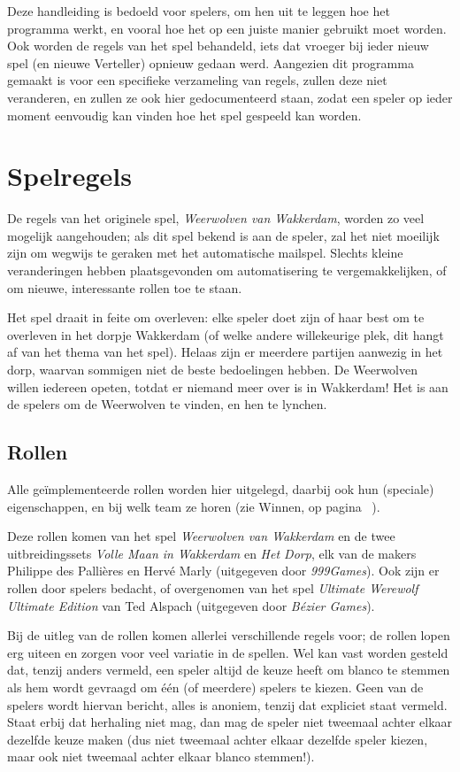 \documentclass[12pt]{article}
\begin{document}
    Deze handleiding is bedoeld voor spelers, om hen uit te leggen hoe het programma werkt, en vooral hoe het op een juiste manier gebruikt moet worden. Ook worden de regels van het spel behandeld, iets dat vroeger bij ieder nieuw spel (en nieuwe Verteller) opnieuw gedaan werd. Aangezien dit programma gemaakt is voor een specifieke verzameling van regels, zullen deze niet veranderen, en zullen ze ook hier gedocumenteerd staan, zodat een speler op ieder moment eenvoudig kan vinden hoe het spel gespeeld kan worden.

\section{Spelregels}

  De regels van het originele spel, \emph{Weerwolven van Wakkerdam}, worden zo veel mogelijk aangehouden; als dit spel bekend is aan de speler, zal het niet moeilijk zijn om wegwijs te geraken met het automatische mailspel. Slechts kleine veranderingen hebben plaatsgevonden om automatisering te vergemakkelijken, of om nieuwe, interessante rollen toe te staan.

  Het spel draait in feite om overleven: elke speler doet zijn of haar best om te overleven in het dorpje Wakkerdam (of welke andere willekeurige plek, dit hangt af van het thema van het spel). Helaas zijn er meerdere partijen aanwezig in het dorp, waarvan sommigen niet de beste bedoelingen hebben. De Weerwolven willen iedereen opeten, totdat er niemand meer over is in Wakkerdam! Het is aan de spelers om de Weerwolven te vinden, en hen te lynchen.

  \subsection{Rollen} \label{subsec:rollen}

    Alle ge\"implementeerde rollen worden hier uitgelegd, daarbij ook hun (speciale) eigenschappen, en bij welk team ze horen (zie Winnen, op pagina~\pageref{subsec:winnen} ).
  
    Deze rollen komen van het spel \emph{Weerwolven van Wakkerdam} en de twee uitbreidingssets \emph{Volle Maan in Wakkerdam} en \emph{Het Dorp}, elk van de makers Philippe des Palli\`eres en Herv\'e Marly (uitgegeven door \emph{999Games}). Ook zijn er rollen door spelers bedacht, of overgenomen van het spel \emph{Ultimate Werewolf Ultimate Edition} van Ted Alspach (uitgegeven door \emph{B\'ezier Games}).
  
    Bij de uitleg van de rollen komen allerlei verschillende regels voor; de rollen lopen erg uiteen en zorgen voor veel variatie in de spellen. Wel kan vast worden gesteld dat, tenzij anders vermeld, een speler altijd de keuze heeft om blanco te stemmen als hem wordt gevraagd om \'e\'en (of meerdere) spelers te kiezen. Geen van de spelers wordt hiervan bericht, alles is anoniem, tenzij dat expliciet staat vermeld. Staat erbij dat herhaling niet mag, dan mag de speler niet tweemaal achter elkaar dezelfde keuze maken (dus niet tweemaal achter elkaar dezelfde speler kiezen, maar ook niet tweemaal achter elkaar blanco stemmen!).
  
\end{document}
